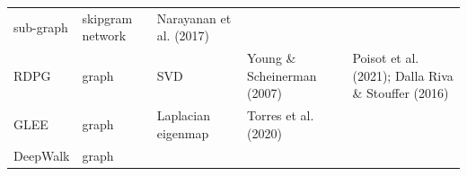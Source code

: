 \documentclass[10pt,oneside]{article}
\begin{document}
\begin{longtable}[]{@{}lllll@{}}
\begin{minipage}[t]{0.11\columnwidth}
sub-graph\strut
\end{minipage} & \begin{minipage}[t]{0.23\columnwidth}\raggedright
skipgram network\strut
\end{minipage} & \begin{minipage}[t]{0.14\columnwidth}\raggedright
Narayanan et al. (2017)\strut
\end{minipage} & \begin{minipage}[t]{0.29\columnwidth}\raggedright
\strut
\end{minipage}\tabularnewline
\begin{minipage}[t]{0.09\columnwidth}\raggedright
RDPG\strut
\end{minipage} & \begin{minipage}[t]{0.11\columnwidth}\raggedright
graph\strut
\end{minipage} & \begin{minipage}[t]{0.23\columnwidth}\raggedright
SVD\strut
\end{minipage} & \begin{minipage}[t]{0.14\columnwidth}\raggedright
Young \& Scheinerman (2007)\strut
\end{minipage} & \begin{minipage}[t]{0.29\columnwidth}\raggedright
Poisot et al. (2021); Dalla Riva \& Stouffer (2016)\strut
\end{minipage}\tabularnewline
\begin{minipage}[t]{0.09\columnwidth}\raggedright
GLEE\strut
\end{minipage} & \begin{minipage}[t]{0.11\columnwidth}\raggedright
graph\strut
\end{minipage} & \begin{minipage}[t]{0.23\columnwidth}\raggedright
Laplacian eigenmap\strut
\end{minipage} & \begin{minipage}[t]{0.14\columnwidth}\raggedright
Torres et al. (2020)\strut
\end{minipage} & \begin{minipage}[t]{0.29\columnwidth}\raggedright
\strut
\end{minipage}\tabularnewline
\begin{minipage}[t]{0.09\columnwidth}\raggedright
DeepWalk\strut
\end{minipage} & \begin{minipage}[t]{0.11\columnwidth}\raggedright
graph\strut
\end{minipage} & \begin{minipage}[t]{0.23\columnwidth}\raggedright

\end{minipage}
\end{longtable}
\end{document}
